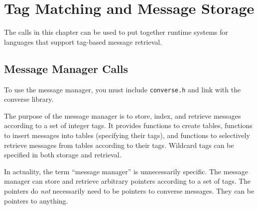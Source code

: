 \chapter{Tag Matching and Message Storage}

The calls in this chapter can be used to put together runtime systems
for languages that support tag-based message retrieval.

\section{Message Manager Calls}

To use the message manager, you must include {\tt converse.h} and
link with the converse library.

The purpose of the message manager is to store, index, and retrieve
messages according to a set of integer tags.  It provides functions to
create tables, functions to insert messages into tables (specifying
their tags), and functions to selectively retrieve messages from
tables according to their tags.  Wildcard tags can be specified in
both storage and retrieval.

In actuality, the term ``message manager'' is unnecessarily specific.
The message manager can store and retrieve arbitrary pointers
according to a set of tags.  The pointers do {\em not} necessarily
need to be pointers to converse messages.  They can be pointers to
anything.





